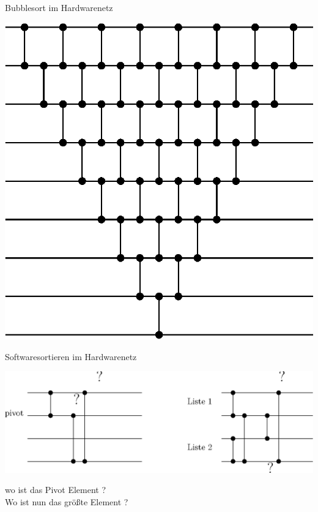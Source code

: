 \documentclass[ucs,9pt]{beamer}
\begin{document}
\begin{frame}{Bubblesort im Hardwarenetz}
	\begin{center}
	    \includegraphics[scale=0.65]{bubblesort.eps}
	\end{center}
\end{frame}

\begin{frame}{Softwaresortieren im Hardwarenetz}
    \begin{center}
    		\includegraphics[scale=0.65]{mergesort.eps}
\end{center}     
 wo ist das Pivot Element ?\\
        Wo ist nun das größte Element ?
\end{frame}
\end{document}
